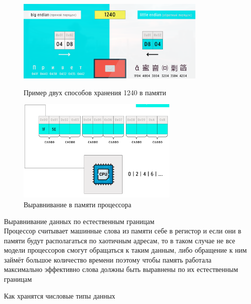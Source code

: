 	\begin{figure}[h]
		\centering
		\begin{minipage}{0.45\textwidth}
			\centering
			\includegraphics[height=4cm]{img/2.0} 
			\captionsetup{font=footnotesize} 
			\caption*{Пример двух способов хранения 1240 в памяти} 
		\end{minipage}
		\hfill
		\begin{minipage}{0.45\textwidth}
			\centering
			\includegraphics[height=5cm]{img/2.1} 
			\captionsetup{font=footnotesize} 
			\caption*{Выравнивание в памяти процессора} 
		\end{minipage}
	\end{figure}
	
	\par Выравнивание данных по естественным границам
	\\
	Процессор считывает машинные слова из памяти себе в регистор и если они в памяти будут располагаться по хаотичным адресам, то в таком случае не все модели процессоров смогут обращаться к таким данным, либо обращение к ним займёт большое количество времени поэтому чтобы память работала максимально эффективно слова должны быть выравнены по их естественным границам 

	\par Как хранятся числовые типы данных 
	
